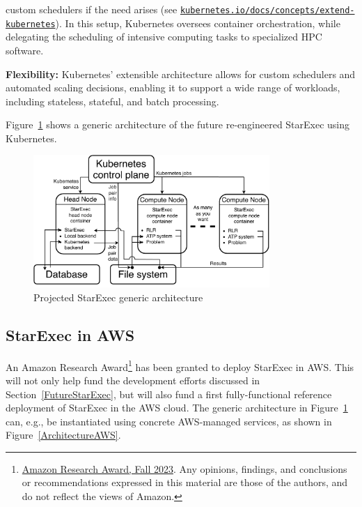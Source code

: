 \documentclass{easychair}
\newenvironment{packed_itemize}{
\vspace*{-0.3em}
\begin{itemize}
\setlength{\partopsep}{0pt}
\setlength{\itemsep}{1pt}
\setlength{\parskip}{0pt}
\setlength{\parsep}{0pt}
}{\end{itemize}}
\begin{document}
\begin{enumerate}
\begin{packed_itemize}
{           custom schedulers if the need arises (see 
           \href{https://kubernetes.io/docs/concepts/extend-kubernetes/}{\tt kubernetes.io/docs/concepts/extend-kubernetes}). 
           In this setup, Kubernetes oversees container orchestration, while delegating the 
           scheduling of intensive computing tasks to specialized HPC software.}
	 \item \textbf{Flexibility:} Kubernetes' extensible architecture allows for custom schedulers 
           and automated scaling decisions, enabling it to support a wide range of workloads, 
           including stateless, stateful, and batch processing.
     \end{packed_itemize}
\end{enumerate}

Figure~\ref{ArchitectureK} shows a generic architecture of the future re-engineered StarExec 
using Kubernetes.

\begin{figure}[htb]
\begin{center}
\includegraphics[width=0.8\textwidth]{ArchitectureK}
\caption{Projected StarExec generic architecture}
\label{ArchitectureK}
\end{center}
\end{figure}

\subsection{StarExec in AWS}

An Amazon Research Award\footnote{%
\href{https://www.amazon.science/research-awards/recipients/geoffrey-sutcliffe}
{Amazon Research Award, Fall 2023}.
Any opinions, findings, and conclusions or recommendations expressed in this material are those 
of the authors, and do not reflect the views of Amazon.} 
has been granted to deploy StarExec in AWS.
This will not only help fund the development efforts discussed in Section~\ref{FutureStarExec}, 
but will also fund a first fully-functional reference deployment of StarExec in the AWS cloud. 
The generic architecture in Figure~\ref{ArchitectureK} can, e.g., be instantiated using concrete 
AWS-managed services, as shown in Figure~\ref{ArchitectureAWS}.
\end{document}
